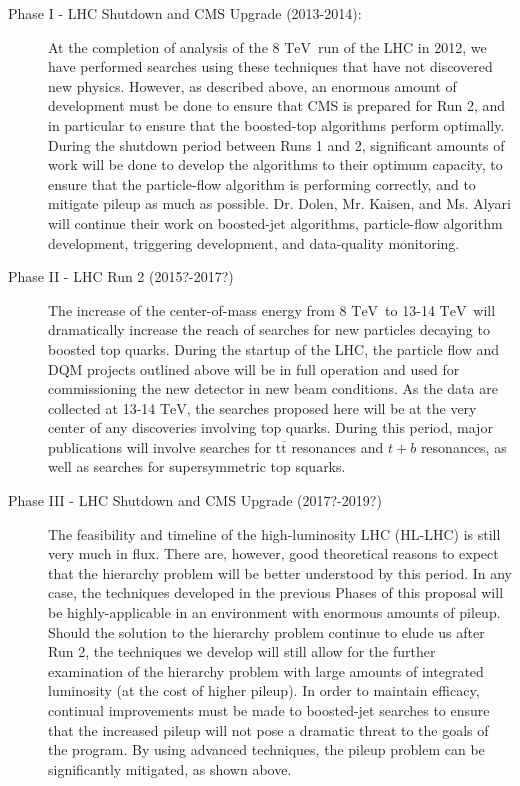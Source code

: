 \documentclass[12pt]{proposalnsf}
\newcommand{\TeV}{\ensuremath{\mathrm{TeV}}}
\newcommand{\ttbar}        {\ensuremath{\mathrm{t}\overline{\mathrm{t}}}}
\begin{document}
\begin{description}
\item[Phase I - LHC Shutdown and CMS Upgrade (2013-2014): ] At the
  completion of analysis of the 8 \TeV\ run of the
  LHC in 2012, we have performed searches using these techniques that
  have not discovered new physics. However, as described above, an
  enormous amount of development must be done to ensure that CMS is
  prepared for Run 2, and in particular to ensure that the boosted-top
  algorithms perform optimally. During the
  shutdown period between Runs 1 and 2, significant amounts of work
  will be done to develop the algorithms to their optimum capacity, to
  ensure that the particle-flow algorithm is performing correctly, and
  to mitigate pileup as much as possible. Dr. Dolen, Mr. Kaisen,
  and Ms. Alyari will continue their work on boosted-jet algorithms,
  particle-flow algorithm development, triggering development, and
  data-quality monitoring.

\item[Phase II - LHC Run 2 (2015?-2017?)] The increase of the center-of-mass
  energy from 8 \TeV\ to 13-14 \TeV\ will dramatically increase the
  reach of searches for new particles decaying to boosted top
  quarks. During the startup of the LHC, the particle flow and DQM
  projects outlined above will be in full operation and used for
  commissioning the new detector in new beam conditions. 
  As the data are collected at 13-14 \TeV, the searches proposed here
  will be at the very
  center of any discoveries involving top quarks. During this period,
  major publications will involve searches for $\ttbar$ resonances and
  $t+b$ resonances, as well as searches for supersymmetric top squarks. 

\item[Phase III - LHC Shutdown and CMS Upgrade (2017?-2019?)] The
  feasibility and timeline of the high-luminosity LHC (HL-LHC) is
  still very much in flux. There are, however, good
  theoretical reasons to expect that the hierarchy problem will be
  better understood by this period. 
  In any case, the techniques developed in the
  previous Phases of this proposal will be highly-applicable in an
  environment with enormous amounts of pileup. Should the solution to
  the hierarchy problem continue to elude us after Run 2, the
  techniques we develop will still allow for
  the further examination of the hierarchy problem with large amounts
  of integrated luminosity (at the cost of higher pileup). In
  order to maintain efficacy, continual improvements must be made to
  boosted-jet searches to ensure that the increased pileup will not
  pose a dramatic threat to the goals of the program. By using
  advanced techniques, the pileup problem can be significantly
  mitigated, as shown above. 


\end{description}
\end{document}
